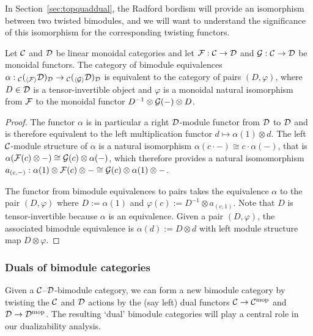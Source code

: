 \documentclass{amsart}
\begin{document}
In Section~\ref{sec:topquaddual}, the Radford bordism will provide an isomorphism between two twisted bimodules, and we will want to understand the significance of this isomorphism for the corresponding twisting functors.

\begin{lemma} \label{lem:BimoduleToFunctor}
Let $\mathcal C$ and $\mathcal D$ be linear monoidal categories and let $\mathcal F: \mathcal C \rightarrow \mathcal D$ and $\mathcal G: \mathcal C \rightarrow \mathcal D$ be monoidal functors.  The category of bimodule equivalences $\alpha: {}_\mathcal C ({}_{\langle \mathcal F \rangle} \mathcal D)_\mathcal D \rightarrow {}_\mathcal C ({}_{\langle \mathcal G \rangle} \mathcal D)_\mathcal D$ is equivalent to the category of pairs $(D, \varphi)$, where $D \in \mathcal D$ is a tensor-invertible object and $\varphi$ is a monoidal natural isomorphism from $\mathcal F$ to the monoidal functor $D^{-1} \otimes \mathcal G(-) \otimes D$.
\end{lemma}
\begin{proof}
The functor $\alpha$ is in particular a right $\mathcal D$-module functor from $\mathcal D$ to $\mathcal D$ and is therefore equivalent to the left multiplication functor $d \mapsto \alpha(1) \otimes d$.  The left $\mathcal C$-module structure of $\alpha$ is a natural isomorphism $\alpha(c \cdot -) \cong c \cdot \alpha(-)$, that is $\alpha(\mathcal F(c) \otimes -) \cong \mathcal G(c) \otimes \alpha(-)$, which therefore provides a natural isomomorphism $a_{(c,-)}: \alpha(1) \otimes \mathcal F(c) \otimes - \cong \mathcal G(c) \otimes \alpha(1) \otimes -$.

The functor from bimodule equivalences to pairs takes the equivalence $\alpha$ to the pair $(D,\varphi)$ where $D:=\alpha(1)$ and $\varphi(c) := D^{-1} \otimes a_{(c,1)}$.  Note that $D$ is tensor-invertible because $\alpha$ is an equivalence.  Given a pair $(D,\varphi)$, the associated bimodule equivalence is $\alpha(d) := D \otimes d$ with left module structure map $D \otimes \varphi$.
\end{proof}


\subsubsection{Duals of bimodule categories}

Given a $\mathcal C$--$\mathcal D$-bimodule category, we can form a new bimodule category by twisting the $\mathcal C$ and $\mathcal D$ actions by the (say left) dual functors $\mathcal C \rightarrow \mathcal C^{\mathrm{mop}}$ and $\mathcal D \rightarrow \mathcal D^{\mathrm{mop}}$.  The resulting `dual' bimodule categories will play a central role in our dualizability analysis.
\end{document}
